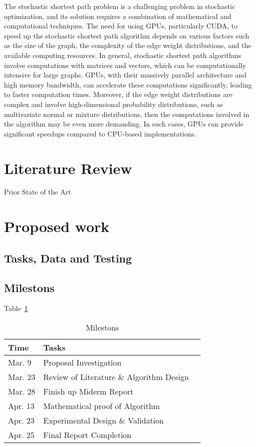 \documentclass{article}
\begin{document}
The stochastic shortest path problem is a challenging problem in stochastic optimization, and its solution requires a combination of mathematical and computational techniques. The need for using GPUs, particularly CUDA, to speed up the stochastic shortest path algorithm depends on various factors such as the size of the graph, the complexity of the edge weight distributions, and the available computing resources. In general, stochastic shortest path algorithms involve computations with matrices and vectors, which can be computationally intensive for large graphs. GPUs, with their massively parallel architecture and high memory bandwidth, can accelerate these computations significantly, leading to faster computation times. Moreover, if the edge weight distributions are complex and involve high-dimensional probability distributions, such as multivariate normal or mixture distributions, then the computations involved in the algorithm may be even more demanding. In such cases, GPUs can provide significant speedups compared to CPU-based implementations.

\section{Literature Review}

Prior State of the Art

\section{Proposed work}

\subsection{Tasks, Data and Testing}

\subsection{Milestons}
Table~\ref{Milestons}

\begin{table}
  \caption{Milestons}
  \label{Milestons}
  \centering
  \begin{tabular}{lll}
    \toprule
    \cmidrule(r){1-2}
    Time     & Tasks \\
    \midrule
    Mar. 9 & Proposal Investigation    \\
    Mar. 23 & Review of Literature \& Algorithm Design   \\
    Mar. 28 & Finish up Miderm Report  \\
    Apr. 13 & Mathematical proof of Algorithm  \\
    Apr. 23 & Experimental Design \& Validation \\
    Apr. 25 & Final Report Completion \\
    \bottomrule
  \end{tabular}
\end{table}
\end{document}
